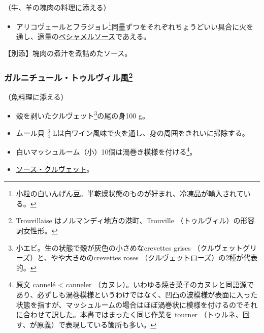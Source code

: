 \begin{recette}


（牛、羊の塊肉の料理に添える）

\begin{itemize}
\tightlist
\item
  アリコヴェールとフラジョレ\footnote{小粒の白いんげん豆。半乾燥状態のものが好まれ、冷凍品が輸入されている。}同量ずつをそれぞれちょうどいい具合に火を通し、適量の\protect\hyperlink{sauce-bechamel}{ベシャメルソース}であえる。
\end{itemize}

【別添】塊肉の煮汁を煮詰めたソース。

\atoaki{}

\hypertarget{garniture-a-la-trouveillaise}{%
\subsubsection[ガルニチュール・トゥルヴィル風]{\texorpdfstring{ガルニチュール・トゥルヴィル風\footnote{Trouvillaise
  はノルマンディ地方の港町、Trouville （トゥルヴィル）の形容詞女性形。}}{ガルニチュール・トゥルヴィル風}}\label{garniture-a-la-trouveillaise}}



（魚料理に添える）

\begin{itemize}
\item
  殻を剥いたクルヴェット\footnote{小エビ。生の状態で殻が灰色の小さめなcrevettes
    grises （クルヴェットグリーズ）と、やや大きめのcrevettes roses
    （クルヴェットローズ）の2種が代表的。}の尾の身100 g。
\item
  ムール貝 \(\frac{3}{4}\)
  Lは白ワイン風味で火を通し、身の周囲をきれいに掃除する。
\item
  白いマッシュルーム（小）10個は渦巻き模様を付ける\footnote{原文 cannelé
    \textless{} canneler
    （カヌレ）。いわゆる焼き菓子のカヌレと同語源であり、必ずしも渦巻模様というわけではなく、凹凸の波模様が表面に入った状態を指すが、マッシュルームの場合はほぼ渦巻状に模様を付けるのでそれに合わせて訳した。本書ではまったく同じ作業を
    tourner （トゥルネ、回す、が原義）で表現している箇所も多い。}。
\item
  \protect\hyperlink{sauce-aux-crevettes}{ソース・クルヴェット}。
\end{itemize}


\end{recette}
